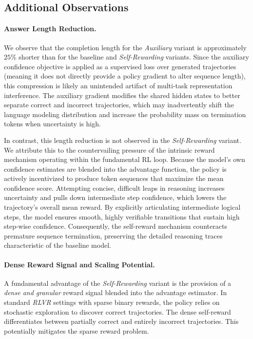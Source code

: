 \documentclass[a4paper,oneside,10pt,ngerman,english]{scrartcl}
\begin{document}
\subsection{Additional Observations}
\label{sec:observations}

\paragraph{Answer Length Reduction.}
We observe that the completion length for the \textit{Auxiliary} variant is approximately $25\%$ shorter than for the baseline and \textit{Self-Rewarding} variants. Since the auxiliary confidence objective is applied as a supervised loss over generated trajectories (meaning it does not directly provide a policy gradient to alter sequence length), this compression is likely an unintended artifact of multi-task representation interference. The auxiliary gradient modifies the shared hidden states to better separate correct and incorrect trajectories, which may inadvertently shift the language modeling distribution and increase the probability mass on termination tokens when uncertainty is high.

In contrast, this length reduction is not observed in the \textit{Self-Rewarding} variant. We attribute this to the countervailing pressure of the intrinsic reward mechanism operating within the fundamental RL loop. Because the model's own confidence estimates are blended into the advantage function, the policy is actively incentivized to produce token sequences that maximize the mean confidence score. Attempting concise, difficult leaps in reasoning increases uncertainty and pulls down intermediate step confidence, which lowers the trajectory's overall mean reward. By explicitly articulating intermediate logical steps, the model ensures smooth, highly verifiable transitions that sustain high step-wise confidence. Consequently, the self-reward mechanism counteracts premature sequence termination, preserving the detailed reasoning traces characteristic of the baseline model.

\paragraph{Dense Reward Signal and Scaling Potential.}
A fundamental advantage of the \textit{Self-Rewarding} variant is the provision of a \textit{dense and granular} reward signal blended into the advantage estimator. In standard \textit{RLVR} settings with sparse binary rewards, the policy relies on stochastic exploration to discover correct trajectories. The dense self-reward differentiates between partially correct and entirely incorrect trajectories. This potentially mitigates the sparse reward problem.
\end{document}
